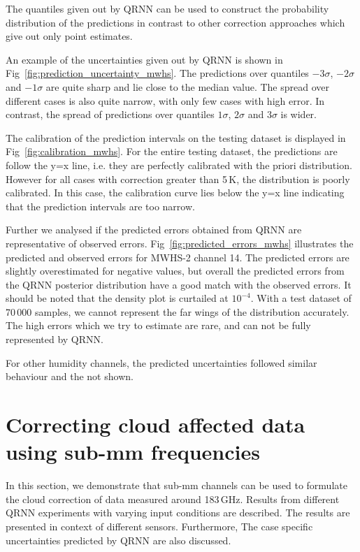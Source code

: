 \documentclass[amt, manuscript]{copernicus}
\begin{document}
The quantiles given out by QRNN can be used to construct the probability distribution of the predictions in contrast to other correction approaches which give out only point estimates. 

An example of the uncertainties given out by QRNN is shown in Fig~\ref{fig:prediction_uncertainty_mwhs}. The predictions over quantiles $-3\sigma$, $-2\sigma$ and $-1\sigma$ are quite sharp and lie close to the median value. The spread over different cases is also quite narrow, with only few cases with high error. In contrast, the spread of predictions over quantiles $1\sigma$, $2\sigma$ and $3\sigma$ is wider. 

The calibration of the prediction intervals on the testing dataset is displayed in Fig~\ref{fig:calibration_mwhs}. For the entire testing dataset, the predictions are follow the y=x line, i.e. they are perfectly calibrated with the priori distribution. However for all cases with correction greater than 5\,K, the distribution is poorly calibrated. In this case, the calibration curve lies below the y=x line indicating that the prediction intervals are too narrow. 


Further we analysed if the  predicted errors obtained from QRNN are representative of observed errors. Fig~\ref{fig:predicted_errors_mwhs} illustrates the predicted and observed errors for MWHS-2 channel 14. The predicted errors are slightly overestimated for negative values, but overall the predicted errors from the QRNN posterior distribution have a good match with the observed errors. It should be noted that the density plot is curtailed at $10^{-4}$. With a test dataset of 70\,000 samples, we cannot represent the far wings of the distribution accurately. The high errors which we try to estimate are rare, and can not be fully represented by QRNN.   

For other humidity channels, the predicted uncertainties followed similar behaviour and the not shown. 


\section{Correcting cloud affected data using sub-mm frequencies}
In this section, we demonstrate that sub-mm channels can be used to formulate the cloud correction of data measured around 183\,GHz. Results from different QRNN experiments with varying input conditions are described. The results are presented in context of different sensors. Furthermore, The case specific uncertainties predicted by QRNN are also discussed.
\end{document}
